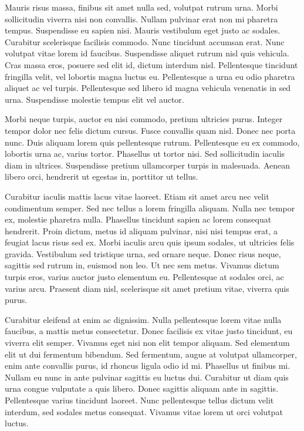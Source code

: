 \documentclass[12pt]{article}
\begin{document}
Mauris risus massa, finibus sit amet nulla sed, volutpat rutrum urna. Morbi sollicitudin viverra nisi non convallis. Nullam pulvinar erat non mi pharetra tempus. Suspendisse eu sapien nisi. Mauris vestibulum eget justo ac sodales. Curabitur scelerisque facilisis commodo. Nunc tincidunt accumsan erat. Nunc volutpat vitae lorem id faucibus. Suspendisse aliquet rutrum nisl quis vehicula. Cras massa eros, posuere sed elit id, dictum interdum nisl. Pellentesque tincidunt fringilla velit, vel lobortis magna luctus eu. Pellentesque a urna eu odio pharetra aliquet ac vel turpis. Pellentesque sed libero id magna vehicula venenatis in sed urna. Suspendisse molestie tempus elit vel auctor.


Morbi neque turpis, auctor eu nisi commodo, pretium ultricies purus. Integer tempor dolor nec felis dictum cursus. Fusce convallis quam nisl. Donec nec porta nunc. Duis aliquam lorem quis pellentesque rutrum. Pellentesque eu ex commodo, lobortis urna ac, varius tortor. Phasellus ut tortor nisi. Sed sollicitudin iaculis diam in ultrices. Suspendisse pretium ullamcorper turpis in malesuada. Aenean libero orci, hendrerit ut egestas in, porttitor ut tellus.


Curabitur iaculis mattis lacus vitae laoreet. Etiam sit amet arcu nec velit condimentum semper. Sed nec tellus a lorem fringilla aliquam. Nulla nec tempor ex, molestie pharetra nulla. Phasellus tincidunt sapien ac lorem consequat hendrerit. Proin dictum, metus id aliquam pulvinar, nisi nisi tempus erat, a feugiat lacus risus sed ex. Morbi iaculis arcu quis ipsum sodales, ut ultricies felis gravida. Vestibulum sed tristique urna, sed ornare neque. Donec risus neque, sagittis sed rutrum in, euismod non leo. Ut nec sem metus. Vivamus dictum turpis eros, varius auctor justo elementum eu. Pellentesque at sodales orci, ac varius arcu. Praesent diam nisl, scelerisque sit amet pretium vitae, viverra quis purus.


Curabitur eleifend at enim ac dignissim. Nulla pellentesque lorem vitae nulla faucibus, a mattis metus consectetur. Donec facilisis ex vitae justo tincidunt, eu viverra elit semper. Vivamus eget nisi non elit tempor aliquam. Sed elementum elit ut dui fermentum bibendum. Sed fermentum, augue at volutpat ullamcorper, enim ante convallis purus, id rhoncus ligula odio id mi. Phasellus ut finibus mi. Nullam eu nunc in ante pulvinar sagittis eu luctus dui. Curabitur ut diam quis urna congue vulputate a quis libero. Donec sagittis aliquam ante in sagittis. Pellentesque varius tincidunt laoreet. Nunc pellentesque tellus dictum velit interdum, sed sodales metus consequat. Vivamus vitae lorem ut orci volutpat luctus.
\end{document}

